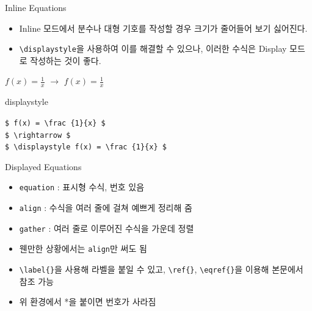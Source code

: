 \documentclass[12pt]{gshs_lecture}
\newcommand{\tb}{\textbackslash}
\newenvironment{codeblock}[1]{
	\begin{block}{#1}
		\setstretch{1.0}
		\begin{small}
}{
		\end{small}
	\end{block}
}
\begin{document}
\begin{frame}[t]{Inline Equations}
	\begin{itemize}
		\item Inline 모드에서 분수나 대형 기호를 작성할 경우 크기가 줄어들어 보기 싫어진다.
		\item \texttt{\tb displaystyle}을 사용하여 이를 해결할 수 있으나, 이러한 수식은 Display 모드로 작성하는 것이 좋다. 
	\end{itemize}
	
	\begin{center}
		$ f(x) = \frac{1}{x} $ $\rightarrow$ $ \displaystyle f(x) = \frac{1}{x} $
	\end{center}
	
	\begin{codeblock}{displaystyle}
		\texttt{\$ f(x) = \tb frac \{1\}\{x\} \$ } \\
		\texttt{\$ \tb rightarrow \$ } \\ 
		\texttt{\$ \tb displaystyle f(x) = \tb frac \{1\}\{x\} \$ } \\
	\end{codeblock}
	
\end{frame}

\begin{frame}[t]{Displayed Equations}
	\begin{itemize}
		\item \texttt{equation} : 표시형 수식, 번호 있음
		\item \texttt{align} : 수식을 여러 줄에 걸쳐 예쁘게 정리해 줌
		\item \texttt{gather} : 여러 줄로 이루어진 수식을 가운데 정렬
		\item 웬만한 상황에서는 \texttt{align}만 써도 됨
		\vskip 1.5pc
		\item \texttt{\tb label\{\}}을 사용해 라벨을 붙일 수 있고, \texttt{\tb ref\{\}}, \texttt{\tb eqref\{\}}을 이용해 본문에서 참조 가능
		\item 위 환경에서 *을 붙이면 번호가 사라짐
	\end{itemize}
\end{frame}
\end{document}
